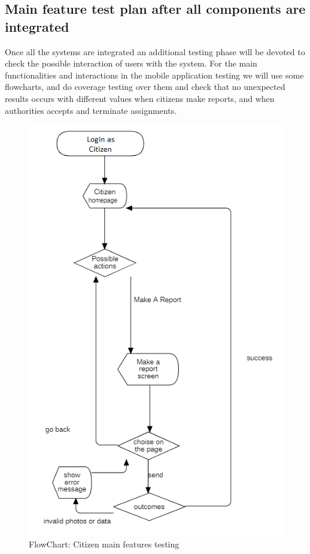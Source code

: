\subsection{Main feature test plan after all components are integrated}
Once all the systems are integrated an additional testing phase will be devoted to check the possible interaction of users with the system. For the main functionalities and interactions in the mobile application
testing we will use some flowcharts, and do coverage testing over them and check that no unexpected results occurs with different values when citizens make reports, and when authorities accepts and terminate assignments.
\begin{figure}[H]
\centering
\includegraphics{Images/FlowChartCitizen.png}
\caption{\label{fig:ComWI}FlowChart: Citizen main features testing}
\end{figure}

